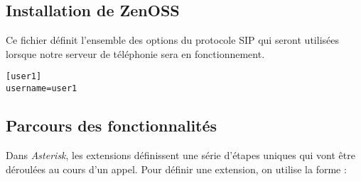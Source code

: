 \documentclass[12pt,a4paper,notitlepage]{article}
\begin{document}
\subsection{Installation de ZenOSS}
Ce fichier définit l'ensemble des options du protocole SIP qui seront utilisées lorsque notre serveur de téléphonie sera en fonctionnement. \\
\begin{lstlisting}[title=sip.conf v1]
[user1]
username=user1
\end{lstlisting}

\subsection{Parcours des fonctionnalités}

Dans \textit{Asterisk}, les extensions définissent une série d'étapes uniques qui vont être déroulées au cours d'un appel. Pour définir une extension, on utilise la forme : \\

\end{document}
